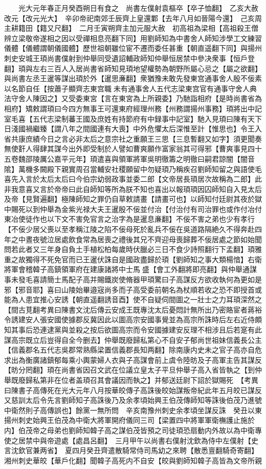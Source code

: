 　　光大元年春正月癸酉朔日有食之　尚書左僕射袁樞卒【卒子恤翻】　乙亥大赦改元【改元光大】　辛卯帝祀南郊壬辰齊上皇還鄴【去年八月如晉陽今還】　己亥周主耕籍田【籍又尺翻】　二月壬寅朔齊主加元服大赦　初高祖為梁相【高祖殺王僧辨立梁敬帝遂相之因以受禪相息亮翻下同】用劉師知為中書舍人師知涉學工文練習儀體【儀體謂朝儀國體】歷世祖朝雖位宦不遷而委任甚重【朝直遥翻下同】與揚州刺史安城王頊尚書僕射到仲舉同受遺詔輔政師知仲舉恒居禁中參决衆事【恒戶登翻】頊與左右三百人入居尚書省師知見頊地望權勢為朝野所屬心忌之【屬之欲翻】與尚書左丞王暹等謀出頊於外【暹思亷翻】衆猶豫未敢先發東宫通事舍人殷不佞素以名節自任【按蕭子顯齊志東宫職未有通事舍人五代志梁東宫官有通事守舍人典法守舍人陳因之】又受委東宮【言在東宮為上所親委】乃馳詣相府【是時尚書省為相府】矯敕謂頊曰今四方無事王可還東府經理州務【州務謂揚州事務】頊將出中記室毛喜【五代志梁制蕃王國及庶姓有持節府有中録事中記室】馳入見頊曰陳有天下日淺國禍繼臻【謂八年之間國連有大喪】中外危懼太后深惟至計【惟思也】令王入省共康庶績今日之言必非太后之意宗社之重願王三思【三息暫翻又如字】須更聞奏無使姧人得肆其謀今出外即受制於人譬如曹爽願作富家翁其可得邪【曹爽事見四十五卷魏邵陵厲公嘉平元年】頊遣喜與領軍將軍吳明徹籌之明徹曰嗣君諒闇【闇音隂】萬機多闕殿下親實周召當輔安社稷願留中勿疑頊乃稱疾召劉師知留之與語使毛喜先入言於太后太后曰今伯宗幼弱政事並委二郎【文帝居長頊居次故稱為二郎】此非我意喜又言於帝帝曰此自師知等所為朕不知也喜出以報頊頊因囚師知自入見太后及帝【見賢遍翻】極陳師知之罪仍自草敕請畫【請畫可也】以師知付廷尉其夜於獄中賜死以到仲舉為金紫光禄大夫王暹殷不佞並付治【付治付有司治罪也或作付冶付東冶使徒作也以下文不害免官言之治字為是暹息亷翻】不佞不害之弟也少有孝行【不佞少居父喪以至孝稱江陵之陷不佞母死於亂兵不佞在吳道路隔絶久不得奔赴四年之中晝夜號泣居處飲食常為居喪之禮後其兄不齊迎母喪歸葬不佞居處之節如始聞問若此者又三年身自負土手植松柏每歲時伏臘必三日不食少詩照翻行下孟翻】頊雅重之故獨得不死免官而已王暹伏誅自是國政盡歸於頊【劉師知之事大類楊愔】右衛將軍會稽韓子高鎮領軍府在建康諸將中士馬盛【會工外翻將即亮翻】與仲舉通謀事未發毛喜請簡士馬配子高并賜鐵炭使脩器甲頊驚曰子高謀反方欲收執何為更如是邪【邪音耶】喜曰山陵始畢邉宼尚多而子高受委前朝名為杖順若收之恐不即授首或能為人患宜推心安誘【朝直遥翻誘音酉】使不自疑伺間圖之一壯士之力耳頊深然之【間古莧翻考異曰陳書文沈后傳云安成王既專沈太后憂悶計無所出乃密賂宦者蔣裕令誘建安人張安國使據郡反冀因此以圖高宗安國事覺並為高宗所誅時后左右近侍頗知其事后恐連逮黨與並殺之按后欲圖高宗而令安國據建安反理不相涉且后若寔有此謀高宗既立后豈得自全今删去】仲舉既廢歸私第心不自安子郁尚世祖妹信義長公主【信義郡名五代志吳郡常熟縣梁置信義郡長知两翻】除南康内史未之官子高亦自危求出為衡廣諸鎮郁每乘小輿蒙婦人衣與子高謀會前上虞令陸昉及子高軍主告其謀反【昉分罔翻】頊在尚書省因召文武在位議立皇太子平旦仲舉子高入省皆執之【到仲舉既廢歸私第非在位者盖頊召其會議因而執之】并郁送廷尉下詔於獄賜死　【考異曰陳書子高傳死在光大元年八月按華皎傳子高誅後皎始謀叛帝紀此年五月皎已謀反又慈訓太后令先言劉師知子高誅後乃及余孝頃始興王伯茂傳師知等誅後伯茂乃進號中衛然則子高傳誤也】餘黨一無所問　辛亥南豫州刺史余孝頃坐謀反誅　癸丑以東揚州刺史始興王伯茂為中衛大將軍開府儀同三司【梁置四中將軍軍衛橅護止施於内】伯茂帝之母弟也劉師知韓子高之謀伯茂皆預之司徒頊恐扇動内外故以為中衛專使之居禁中與帝遊處【處昌呂翻】　三月甲午以尚書右僕射沈欽為侍中左僕射【史言沈欽官兼两省】　夏四月癸丑齊遣散騎常侍司馬幼之來聘【散悉亶翻騎奇寄翻】　湘州刺史華皎【華戶化翻】聞韓子高死内不自安【皎與劉師知韓子高皆為文帝所親